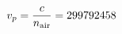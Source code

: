\documentclass[preview]{standalone}
\begin{document}
\begin{align*}
\special{dvisvgm:raw <g id='unique000'>}v_p = \frac{c}{n_{\text{air}}} = 299792458\special{dvisvgm:raw </g>}
\end{align*}
\end{document}
